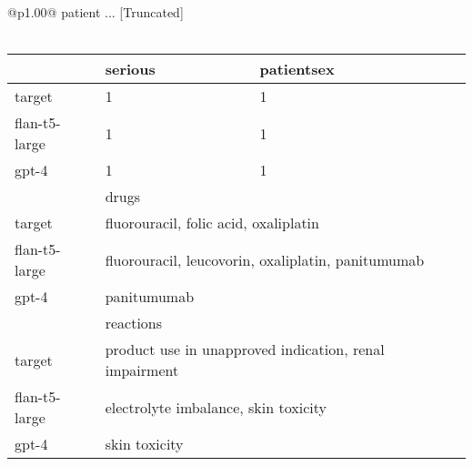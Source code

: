 \begin{longtable}{@{}p{}@{}}
patient ... [Truncated] \\ \\ \begin{tabular}{lll} \hline & serious & patientsex \\ \hline target & 1 & 1 \\ flan-t5-large & 1 & 1 \\ gpt-4 & 1 & 1 \\ \hline & \multicolumn{2}{l}{drugs} \\ \hline target & \multicolumn{2}{p{13.2cm}}{fluorouracil, folic acid, oxaliplatin} \\ flan-t5-large & \multicolumn{2}{p{13.2cm}}{fluorouracil, leucovorin, oxaliplatin, panitumumab} \\ gpt-4 & \multicolumn{2}{p{13.2cm}}{panitumumab} \\ \hline & \multicolumn{2}{l}{reactions} \\ \hline target & \multicolumn{2}{p{13.2cm}}{product use in unapproved indication, renal impairment} \\ flan-t5-large & \multicolumn{2}{p{13.2cm}}{electrolyte imbalance, skin toxicity} \\ gpt-4 & \multicolumn{2}{p{13.2cm}}{skin toxicity} \\ \hline \end{tabular} \\ \\

\end{longtable}
